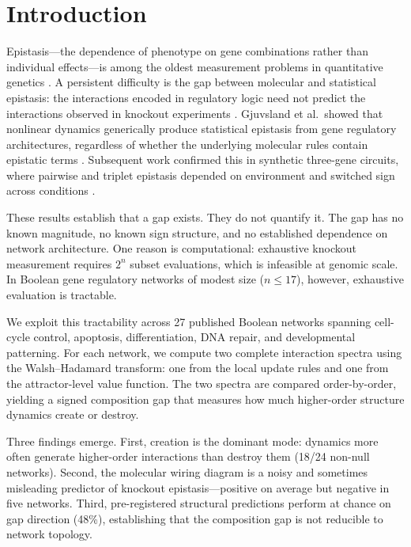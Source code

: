 \documentclass[10pt,letterpaper]{article}
\begin{document}
\linenumbers


\section*{Introduction}
\label{sec:intro}

Epistasis---the dependence of phenotype on gene combinations rather
than individual effects---is among the oldest measurement problems in
quantitative genetics \cite{fisher1918correlation, bateson1909heredity}. A
persistent difficulty is the gap between molecular and statistical
epistasis: the interactions encoded in regulatory logic need not
predict the interactions observed in knockout experiments
\cite{phillips2008epistasis}. Gjuvsland et al.\ showed
that nonlinear dynamics generically produce statistical epistasis from
gene regulatory architectures, regardless of whether the underlying
molecular rules contain epistatic terms \cite{gjuvsland2007statistical}.
Subsequent work confirmed this in synthetic three-gene
circuits, where pairwise and triplet epistasis depended on environment
and switched sign across conditions \cite{baier2023environment}.

These results establish that a gap exists. They do not quantify it.
The gap has no known magnitude, no known sign structure, and no
established dependence on network architecture. One reason is
computational: exhaustive knockout measurement requires $2^n$ subset
evaluations, which is infeasible at genomic scale. In Boolean gene
regulatory networks of modest size ($n \leq 17$), however, exhaustive
evaluation is tractable.

We exploit this tractability across 27 published Boolean networks
spanning cell-cycle control, apoptosis, differentiation, DNA repair,
and developmental patterning. For each network, we compute two
complete interaction spectra using the Walsh--Hadamard transform: one
from the local update rules and one from the attractor-level value
function. The two spectra are compared order-by-order, yielding a
signed composition gap that measures how much higher-order structure
dynamics create or destroy.

Three findings emerge. First, creation is the dominant mode: dynamics
more often generate higher-order interactions than destroy them (18/24
non-null networks). Second, the molecular wiring diagram is a noisy
and sometimes misleading predictor of knockout epistasis---positive on
average but negative in five networks. Third, pre-registered
structural predictions perform at chance on gap direction (48\%),
establishing that the composition gap is not reducible to network
topology.
\end{document}
